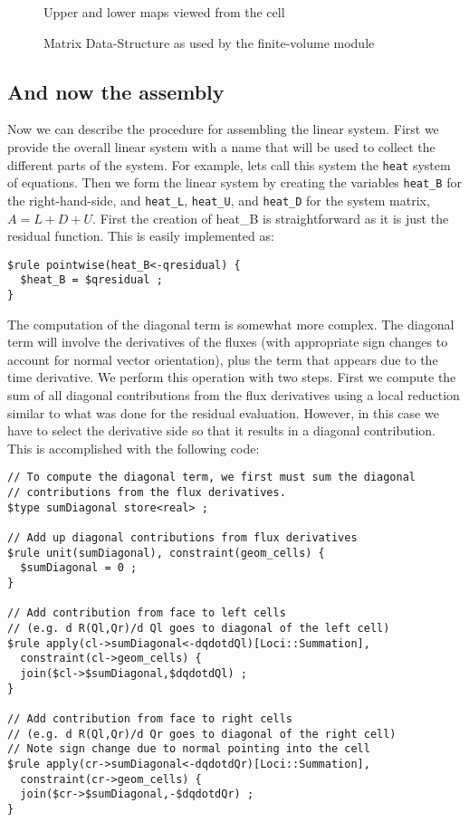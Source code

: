 \documentclass[10pt,epsf,letterpaper,twoside]{book}
\begin{document}
\begin{figure}[htbp]
 \centerline{
  \epsfxsize=2.4in
  }
 \caption{Upper and lower maps viewed from the cell}
\label{cellperspective}
\end{figure}

\begin{figure}[htbp]
 \centerline{
  \epsfxsize=4.5in
  }
 \caption{Matrix Data-Structure as used by the finite-volume module}
\label{matrixperspective}
\end{figure}
\subsection{And now the assembly}

Now we can describe the procedure for assembling the linear system.
First we provide the overall linear system with a name that will be
used to collect the different parts of the system.  For example, lets
call this system the {\tt heat} system of equations.  Then we form the
linear system by creating the variables {\tt heat\_B} for the
right-hand-side, and {\tt heat\_L}, {\tt heat\_U}, and {\tt heat\_D}
for the system matrix, $A=L+D+U$.  First the creation of heat\_B is
straightforward as it is just the residual function.  This is easily
implemented as:
\begin{verbatim}
$rule pointwise(heat_B<-qresidual) {
  $heat_B = $qresidual ;
}
\end{verbatim}

The computation of the diagonal term is somewhat more complex.  The
diagonal term will involve the derivatives of the fluxes (with
appropriate sign changes to account for normal vector orientation),
plus the term that appears due to the time derivative.  We perform
this operation with two steps.  First we compute the sum of all
diagonal contributions from the flux derivatives using a local
reduction similar to what was done for the residual evaluation.
However, in this case we have to select the derivative side so that
it results in a diagonal contribution.  This is accomplished with the
following code:

\begin{verbatim}
// To compute the diagonal term, we first must sum the diagonal
// contributions from the flux derivatives.
$type sumDiagonal store<real> ;

// Add up diagonal contributions from flux derivatives
$rule unit(sumDiagonal), constraint(geom_cells) {
  $sumDiagonal = 0 ;
}

// Add contribution from face to left cells
// (e.g. d R(Ql,Qr)/d Ql goes to diagonal of the left cell)
$rule apply(cl->sumDiagonal<-dqdotdQl)[Loci::Summation],
  constraint(cl->geom_cells) {
  join($cl->$sumDiagonal,$dqdotdQl) ;
}

// Add contribution from face to right cells 
// (e.g. d R(Ql,Qr)/d Qr goes to diagonal of the right cell)
// Note sign change due to normal pointing into the cell
$rule apply(cr->sumDiagonal<-dqdotdQr)[Loci::Summation],
  constraint(cr->geom_cells) {
  join($cr->$sumDiagonal,-$dqdotdQr) ;
}
\end{verbatim}
\end{document}
